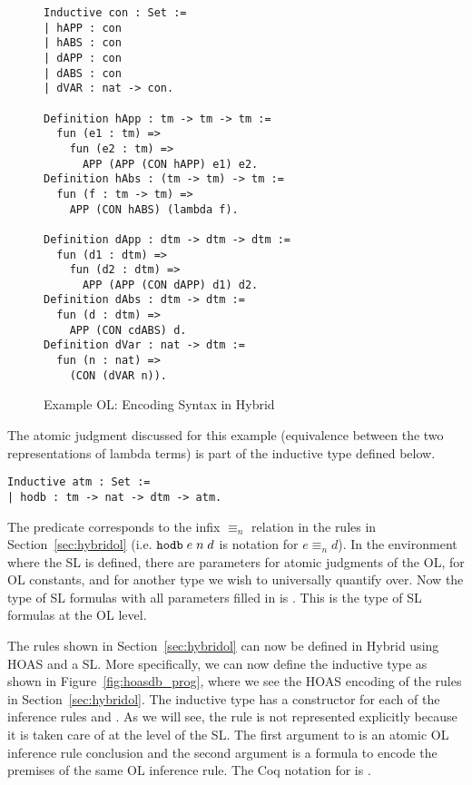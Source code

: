 \begin{figure}
\begin{lstlisting}
Inductive con : Set := 
| hAPP : con
| hABS : con
| dAPP : con
| dABS : con
| dVAR : nat -> con.

Definition hApp : tm -> tm -> tm :=
  fun (e1 : tm) =>
    fun (e2 : tm) =>
      APP (APP (CON hAPP) e1) e2. 
Definition hAbs : (tm -> tm) -> tm :=
  fun (f : tm -> tm) => 
    APP (CON hABS) (lambda f).

Definition dApp : dtm -> dtm -> dtm :=
  fun (d1 : dtm) =>
    fun (d2 : dtm) =>
      APP (APP (CON dAPP) d1) d2. 
Definition dAbs : dtm -> dtm :=
  fun (d : dtm) =>
    APP (CON cdABS) d.
Definition dVar : nat -> dtm :=
  fun (n : nat) =>
    (CON (dVAR n)).
\end{lstlisting}
\caption{Example OL: Encoding Syntax in Hybrid \label{fig:hoasdb_con}}
\end{figure}

The atomic judgment discussed for this example (equivalence between the two representations of lambda terms) is part of the inductive type  defined below.
\begin{lstlisting}
Inductive atm : Set :=
| hodb : tm -> nat -> dtm -> atm.
\end{lstlisting}
The predicate  corresponds to the infix $\equiv_n$ relation in the rules in Section~\ref{sec:hybridol} (i.e. $\texttt{hodb} \; e \; n \; d$ is notation for $e \equiv_n d$). In the environment where the SL is defined, there are parameters  for atomic judgments of the OL,  for OL constants, and  for another type we wish to universally quantify over. Now the type of SL formulas with all parameters filled in is . This is the type of SL formulas at the OL level. %

The rules shown in Section~\ref{sec:hybridol} can now be defined in Hybrid using HOAS and a SL. More specifically, we can now define the inductive type  as shown in Figure~\ref{fig:hoasdb_prog}, where we see the HOAS encoding of the rules in Section~\ref{sec:hybridol}. The inductive type  has a constructor for each of the inference rules  and . As we will see, the  rule is not represented explicitly because it is taken care of at the level of the SL. The first argument to  is an atomic OL inference rule conclusion and the second argument is a formula to encode the premises of the same OL inference rule. The Coq notation for  is .

